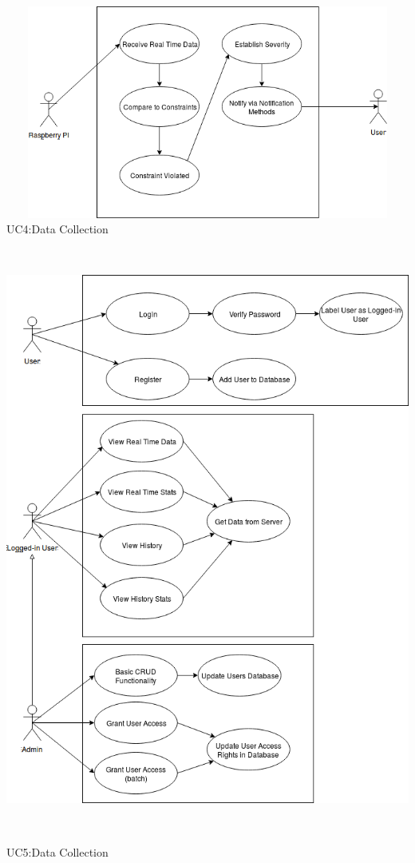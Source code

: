 \centering
\includegraphics[width=15cm, height=7cm]{Diagrams/UseCase4.png}
UC4:Data Collection
\\

\centering
\includegraphics[width=15cm, height=20cm]{Diagrams/UseCase5.png}
UC5:Data Collection